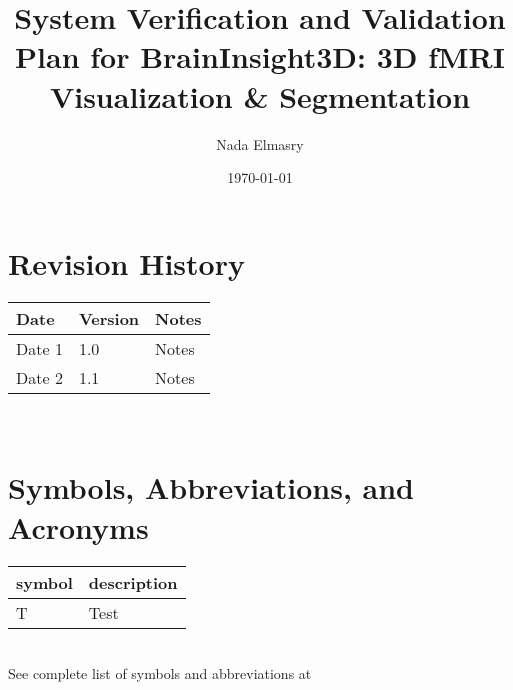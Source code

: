 \documentclass[12pt, titlepage]{article}
\begin{document}
\title{System Verification and Validation Plan for BrainInsight3D: 3D fMRI
  Visualization \& Segmentation}
\author{Nada Elmasry}
\date{\today}

\maketitle


\section*{Revision History}

\begin{tabularx}{\textwidth}{p{3cm}p{2cm}X}
  \toprule {\bf Date} & {\bf Version} & {\bf Notes} \\
  \midrule
  Date 1              & 1.0           & Notes       \\
  Date 2              & 1.1           & Notes       \\
  \bottomrule
\end{tabularx}

~\\

\newpage

\tableofcontents



\newpage

\section{Symbols, Abbreviations, and Acronyms}

\renewcommand{\arraystretch}{1.2}
\begin{tabular}{l l}
  \toprule
  \textbf{symbol} & \textbf{description} \\
  \midrule
  T               & Test                 \\
  \bottomrule
\end{tabular}\\

See complete list of symbols and abbreviations at \cite{BrainInsightSRS2024}

\end{document}
